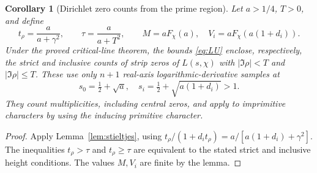 \documentclass[11pt]{article}
\newtheorem{corollary}[theorem]{Corollary}
\theoremstyle{remark}\newtheorem{remark}[theorem]{Remark}
\begin{document}
\begin{corollary}[Dirichlet zero counts from the prime region]\label{cor:grh}
Let $a>1/4$, $T>0$, and define
\[
 t_\rho=\frac{a}{a+\gamma^2},\qquad \tau=\frac{a}{a+T^2},\qquad
 M=aF_\chi(a),\quad V_i=aF_\chi(a(1+d_i)).
\]
Under the proved critical-line theorem, the bounds \eqref{eq:LU} enclose, respectively, the strict and inclusive counts of strip zeros of $L(s,\chi)$ with $|\Im\rho|<T$ and $|\Im\rho|\le T$. These use only $n+1$ real-axis logarithmic-derivative samples at
\[
 s_0=\tfrac12+\sqrt a,\quad s_i=\tfrac12+\sqrt{a(1+d_i)}>1.
\]
They count multiplicities, including central zeros, and apply to imprimitive characters by using the inducing primitive character.
\end{corollary}
\begin{proof}
Apply Lemma~\ref{lem:stieltjes}, using $t_\rho/(1+d_i t_\rho)=a/[a(1+d_i)+\gamma^2]$. The inequalities $t_\rho>\tau$ and $t_\rho\ge\tau$ are equivalent to the stated strict and inclusive height conditions. The values $M,V_i$ are finite by the lemma.
\end{proof}
\end{document}
